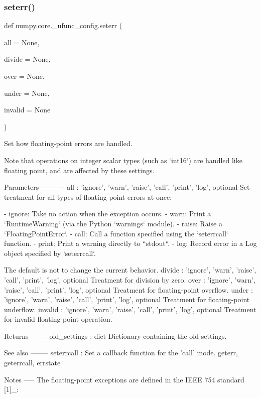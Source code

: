 \subsubsection{\texorpdfstring{seterr()}{seterr()}}
{\footnotesize\ttfamily def numpy.\+core.\+\_\+ufunc\+\_\+config.\+seterr (\begin{DoxyParamCaption}\item[{}]{all = {\ttfamily None},  }\item[{}]{divide = {\ttfamily None},  }\item[{}]{over = {\ttfamily None},  }\item[{}]{under = {\ttfamily None},  }\item[{}]{invalid = {\ttfamily None} }\end{DoxyParamCaption})}

\begin{DoxyVerb}Set how floating-point errors are handled.

Note that operations on integer scalar types (such as `int16`) are
handled like floating point, and are affected by these settings.

Parameters
----------
all : {'ignore', 'warn', 'raise', 'call', 'print', 'log'}, optional
    Set treatment for all types of floating-point errors at once:

    - ignore: Take no action when the exception occurs.
    - warn: Print a `RuntimeWarning` (via the Python `warnings` module).
    - raise: Raise a `FloatingPointError`.
    - call: Call a function specified using the `seterrcall` function.
    - print: Print a warning directly to ``stdout``.
    - log: Record error in a Log object specified by `seterrcall`.

    The default is not to change the current behavior.
divide : {'ignore', 'warn', 'raise', 'call', 'print', 'log'}, optional
    Treatment for division by zero.
over : {'ignore', 'warn', 'raise', 'call', 'print', 'log'}, optional
    Treatment for floating-point overflow.
under : {'ignore', 'warn', 'raise', 'call', 'print', 'log'}, optional
    Treatment for floating-point underflow.
invalid : {'ignore', 'warn', 'raise', 'call', 'print', 'log'}, optional
    Treatment for invalid floating-point operation.

Returns
-------
old_settings : dict
    Dictionary containing the old settings.

See also
--------
seterrcall : Set a callback function for the 'call' mode.
geterr, geterrcall, errstate

Notes
-----
The floating-point exceptions are defined in the IEEE 754 standard [1]_:


\end{DoxyVerb}
